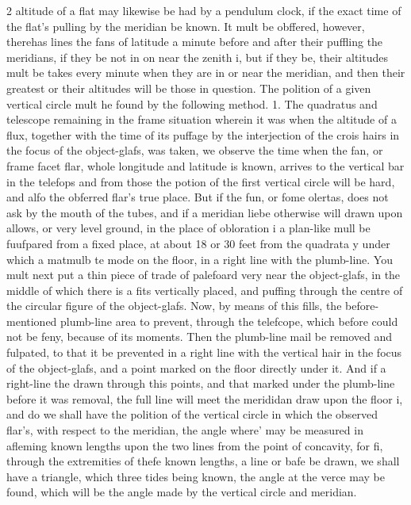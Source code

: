 \documentclass[10pt]{article}
\begin{document}
\begin{multicols}{2}
altitude of a flat may likewise be had by a pendulum clock, if the exact time of the flat’s pulling by the meridian be known. It mult be obffered, however, therehas lines the fans of latitude a minute before and after their puffling the meridians, if they be not in on near the zenith i, but if they be, their altitudes mult be takes every minute when they are in or near the meridian, and then their greatest or their altitudes will be those in question. The polition of a given vertical circle mult he found by the following method. 1. The quadratus and telescope remaining in the frame situation wherein it was when the altitude of a flux, together with the time of its puffage by the interjection of the crois hairs in the focus of the object-glafs, was taken, we observe the time when the fan, or frame facet flar, whole longitude and latitude is known, arrives to the vertical bar in the telefops and from those the potion of the first vertical circle will be hard, and alfo the obferred flar's true place. But if the fun, or fome olertas, does not ask by the mouth of the tubes, and if a meridian liebe otherwise will drawn upon allows, or very level ground, in the place of obloration i a plan-like mull be fuufpared from a fixed place, at about 18 or 30 feet from the quadrata y under which a matmulb te mode on the floor, in a right line with the plumb-line. You mult next put a thin piece of trade of palefoard very near the object-glafs, in the middle of which there is a fits vertically placed, and puffing through the centre of the circular figure of the object-glafs. Now, by means of this fills, the before-mentioned plumb-line area to prevent, through the telefcope, which before could not be feny, because of its moments. Then the plumb-line mail be removed and fulpated, to that it be prevented in a right line with the vertical hair in the focus of the object-glafs, and a point marked on the floor directly under it. And if a right-line the drawn through this points, and that marked under the plumb-line before it was removal, the full line will meet the merididan draw upon the floor i, and do we shall have the polition of the vertical circle in which the observed flar's, with respect to the meridian, the angle where' may be measured in afleming known lengths upon the two lines from the point of concavity, for fi, through the extremities of thefe known lengths, a line or bafe be drawn, we shall have a triangle, which three tides being known, the angle at the verce may be found, which will be the angle made by the vertical circle and meridian.


\end{multicols}
\end{document}
